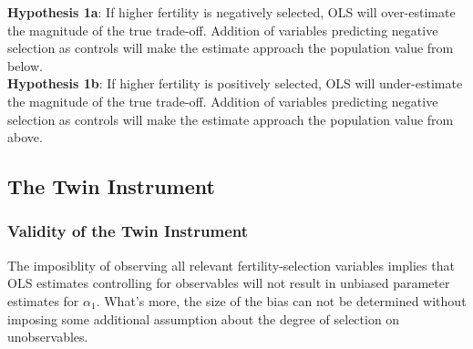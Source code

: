 \documentclass[subeqn]{article}
\begin{document}
\begin{spacing}{1.4}
\noindent %
\textbf{Hypothesis 1a}: If higher fertility is negatively selected, OLS will over-estimate the magnitude of the true trade-off. Addition of variables predicting negative selection as controls will make the estimate approach the population value from below.\\
\textbf{Hypothesis 1b}: If higher fertility is positively selected, OLS will under-estimate the magnitude of the true trade-off. Addition of variables predicting negative selection as controls will make the estimate approach the population value from above.

\subsection{The Twin Instrument}
\subsubsection{Validity of the Twin Instrument}
\label{sscn:validIV}
The imposiblity of observing all relevant fertility-selection variables
implies that OLS estimates controlling for observables will not result
in unbiased parameter estimates for $\alpha_1$.  What's more, the size
of the bias can not be determined without imposing some additional
assumption about the degree of selection on unobservables.


\end{spacing}
\end{document}
